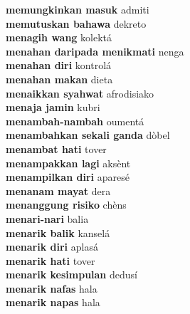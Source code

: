 \textbf{ memungkinkan masuk  } admiti \\
\textbf{ memutuskan bahawa  } dekreto \\
\textbf{ menagih wang  } kolektá \\
\textbf{ menahan daripada menikmati  } nenga \\
\textbf{ menahan diri  } kontrolá \\
\textbf{ menahan makan  } dieta \\
\textbf{ menaikkan syahwat  } afrodisiako \\
\textbf{ menaja jamin  } kubri \\
\textbf{ menambah-nambah  } oumentá \\
\textbf{ menambahkan sekali ganda  } dòbel \\
\textbf{ menambat hati  } tover \\
\textbf{ menampakkan lagi  } aksènt \\
\textbf{ menampilkan diri  } aparesé \\
\textbf{ menanam mayat  } dera \\
\textbf{ menanggung risiko  } chèns \\
\textbf{ menari-nari  } balia \\
\textbf{ menarik balik  } kanselá \\
\textbf{ menarik diri  } aplasá \\
\textbf{ menarik hati  } tover \\
\textbf{ menarik kesimpulan  } dedusí \\
\textbf{ menarik nafas  } hala \\
\textbf{ menarik napas  } hala \\
